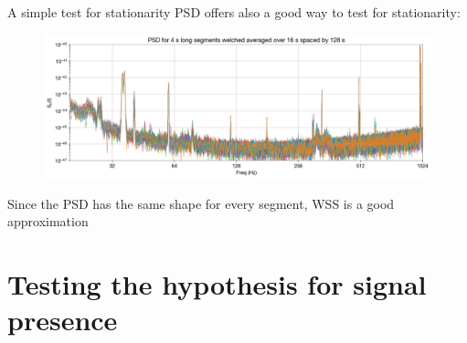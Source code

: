\documentclass[
10pt,
aspectratio=169,
]{beamer}
\begin{document}
\begin{frame}{A simple test for stationarity}
    PSD offers also a good way to test for stationarity:
    \begin{figure}
        \centering
        \includegraphics[width=\textwidth]{stationarity_test.png}
    \end{figure}
    Since the PSD has the same shape for every segment, WSS is a good approximation
\end{frame}

\section{Testing the hypothesis for signal presence}
\end{document}
